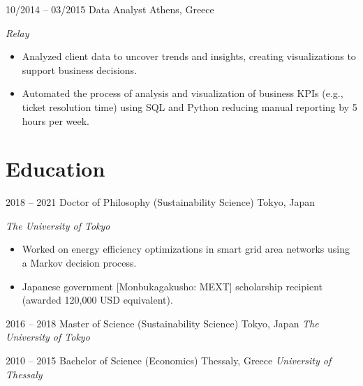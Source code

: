 \begin{entrylist}
\entry
{10/2014 -- 03/2015}
{Data Analyst}
{Athens, Greece}
{\emph{Relay}
\begin{itemize}
\item Analyzed client data to uncover trends and insights, creating visualizations to support business decisions. %
\item Automated the process of analysis and visualization of business KPIs (e.g., ticket resolution time) using SQL and Python reducing manual reporting by 5 hours per week. %
\end{itemize}
}

\end{entrylist}

\section{Education}
\begin{entrylist}
\entry
{2018 -- 2021}
{Doctor of Philosophy  (Sustainability Science)}
{Tokyo, Japan}
{\emph{The University of Tokyo}
\begin{itemize}
\item Worked on energy efficiency optimizations in smart grid area networks using a Markov decision process.
\item Japanese government [Monbukagakusho: MEXT] scholarship recipient (awarded 120,000 USD equivalent).
\end{itemize}
}
\end{entrylist}
\begin{entrylist}
\entry
{2016 -- 2018}
{Master of Science (Sustainability Science)}
{Tokyo, Japan}
{\emph{The University of Tokyo}}
\end{entrylist}

\begin{entrylist}
\entry
{2010 -- 2015}
{Bachelor of Science (Economics)}
{Thessaly, Greece}
{\emph{University of Thessaly}}
\end{entrylist}



